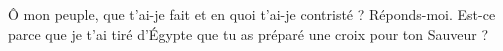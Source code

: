 Ô mon peuple, que t’ai-je fait et en quoi t’ai-je contristé ? Réponds-moi.
\versseparator
Est-ce parce que je t’ai tiré d’Égypte que tu as préparé une croix pour ton Sauveur ?